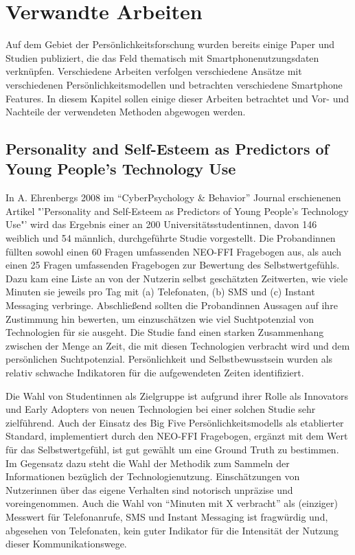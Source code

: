 \section{Verwandte Arbeiten}
\label{ch:Grundlagen:sec:RelatedWork}

Auf dem Gebiet der Persönlichkeitsforschung wurden bereits einige Paper und Studien publiziert,
die das Feld thematisch mit Smartphonenutzungsdaten verknüpfen. 
Verschiedene Arbeiten verfolgen verschiedene Ansätze mit verschiedenen Persönlichkeitsmodellen und betrachten verschiedene Smartphone Features.
In diesem Kapitel sollen einige dieser Arbeiten betrachtet und Vor- und Nachteile der verwendeten Methoden abgewogen werden.

\subsection*{Personality and Self-Esteem as Predictors of Young People’s Technology Use}

In A. Ehrenbergs 2008 im "`CyberPsychology \& Behavior"' Journal erschienenen Artikel "'Personality and Self-Esteem as Predictors of Young People’s Technology Use"' \cite{ehrenberg2008personality}
wird das Ergebnis einer an 200 Universitätsstudentinnen, davon 146 weiblich und 54  männlich, durchgeführte Studie vorgestellt.
Die Probandinnen füllten sowohl einen 60 Fragen umfassenden NEO-FFI Fragebogen aus, als auch einen 25 Fragen umfassenden Fragebogen zur Bewertung des Selbstwertgefühls.
Dazu kam eine Liste an von der Nutzerin selbst geschätzten Zeitwerten, wie viele Minuten sie jeweils pro Tag mit (a) Telefonaten, (b) SMS und (c) Instant Messaging verbringe.
Abschließend sollten die Probandinnen Aussagen auf ihre Zustimmung hin bewerten, um einzuschätzen wie viel Suchtpotenzial von Technologien für sie ausgeht.
Die Studie fand einen starken Zusammenhang zwischen der Menge an Zeit, die mit diesen Technologien verbracht wird und dem persönlichen Suchtpotenzial.
Persönlichkeit und Selbstbewusstsein wurden als relativ schwache Indikatoren für die aufgewendeten Zeiten identifiziert.
\par
Die Wahl von Studentinnen als Zielgruppe ist aufgrund ihrer Rolle als Innovators und Early Adopters von neuen Technologien bei einer solchen Studie sehr zielführend.
Auch der Einsatz des Big Five Persönlichkeitsmodells als etablierter Standard, implementiert durch den NEO-FFI Fragebogen, ergänzt mit dem Wert für das Selbstwertgefühl, ist gut gewählt um eine Ground Truth zu bestimmen.
Im Gegensatz dazu steht die Wahl der Methodik zum Sammeln der Informationen bezüglich der Technologienutzung.
Einschätzungen von Nutzerinnen über das eigene Verhalten sind notorisch unpräzise und voreingenommen.
Auch die Wahl von "`Minuten mit X verbracht"' als (einziger) Messwert für Telefonanrufe, SMS und Instant Messaging ist fragwürdig und, abgesehen von Telefonaten, kein guter Indikator für die Intensität der Nutzung dieser Kommunikationswege.



